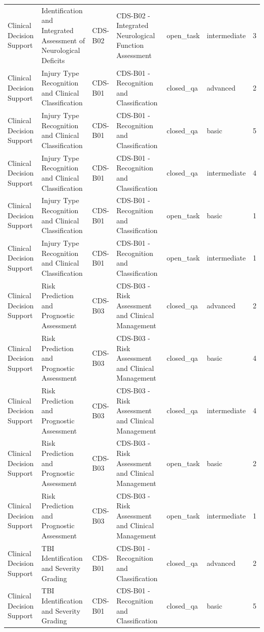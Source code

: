 \begin{tabular}{llllllr}
Clinical Decision Support & Identification and Integrated Assessment of Neurological Deficits & CDS-B02 & CDS-B02 - Integrated Neurological Function Assessment & open_task & intermediate & 3 \\
Clinical Decision Support & Injury Type Recognition and Clinical Classification & CDS-B01 & CDS-B01 - Recognition and Classification & closed_qa & advanced & 2 \\
Clinical Decision Support & Injury Type Recognition and Clinical Classification & CDS-B01 & CDS-B01 - Recognition and Classification & closed_qa & basic & 5 \\
Clinical Decision Support & Injury Type Recognition and Clinical Classification & CDS-B01 & CDS-B01 - Recognition and Classification & closed_qa & intermediate & 4 \\
Clinical Decision Support & Injury Type Recognition and Clinical Classification & CDS-B01 & CDS-B01 - Recognition and Classification & open_task & basic & 1 \\
Clinical Decision Support & Injury Type Recognition and Clinical Classification & CDS-B01 & CDS-B01 - Recognition and Classification & open_task & intermediate & 1 \\
Clinical Decision Support & Risk Prediction and Prognostic Assessment & CDS-B03 & CDS-B03 - Risk Assessment and Clinical Management & closed_qa & advanced & 2 \\
Clinical Decision Support & Risk Prediction and Prognostic Assessment & CDS-B03 & CDS-B03 - Risk Assessment and Clinical Management & closed_qa & basic & 4 \\
Clinical Decision Support & Risk Prediction and Prognostic Assessment & CDS-B03 & CDS-B03 - Risk Assessment and Clinical Management & closed_qa & intermediate & 4 \\
Clinical Decision Support & Risk Prediction and Prognostic Assessment & CDS-B03 & CDS-B03 - Risk Assessment and Clinical Management & open_task & basic & 2 \\
Clinical Decision Support & Risk Prediction and Prognostic Assessment & CDS-B03 & CDS-B03 - Risk Assessment and Clinical Management & open_task & intermediate & 1 \\
Clinical Decision Support & TBI Identification and Severity Grading & CDS-B01 & CDS-B01 - Recognition and Classification & closed_qa & advanced & 2 \\
Clinical Decision Support & TBI Identification and Severity Grading & CDS-B01 & CDS-B01 - Recognition and Classification & closed_qa & basic & 5 \\

\end{tabular}
